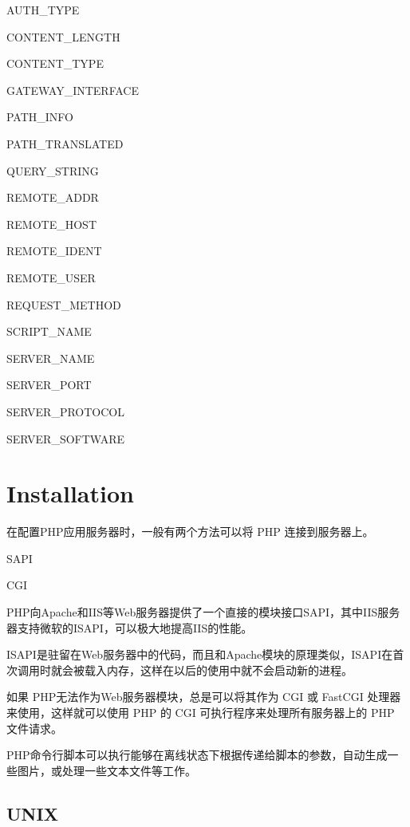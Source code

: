 \begin{compactitem}
\item AUTH\_TYPE
\item CONTENT\_LENGTH
\item CONTENT\_TYPE
\item GATEWAY\_INTERFACE
\item PATH\_INFO
\item PATH\_TRANSLATED
\item QUERY\_STRING
\item REMOTE\_ADDR
\item REMOTE\_HOST
\item REMOTE\_IDENT
\item REMOTE\_USER
\item REQUEST\_METHOD
\item SCRIPT\_NAME
\item SERVER\_NAME
\item SERVER\_PORT
\item SERVER\_PROTOCOL
\item SERVER\_SOFTWARE
\end{compactitem}


\chapter{Installation}

在配置PHP应用服务器时，一般有两个方法可以将 PHP 连接到服务器上。

\begin{compactitem}
\item SAPI
\item CGI
\end{compactitem}

PHP向Apache和IIS等Web服务器提供了一个直接的模块接口SAPI，其中IIS服务器支持微软的ISAPI，可以极大地提高IIS的性能。

ISAPI是驻留在Web服务器中的代码，而且和Apache模块的原理类似，ISAPI在首次调用时就会被载入内存，这样在以后的使用中就不会启动新的进程。

如果 PHP无法作为Web服务器模块，总是可以将其作为 CGI 或 FastCGI 处理器来使用，这样就可以使用 PHP 的 CGI 可执行程序来处理所有服务器上的 PHP 文件请求。

PHP命令行脚本可以执行能够在离线状态下根据传递给脚本的参数，自动生成一些图片，或处理一些文本文件等工作。


\section{UNIX}

